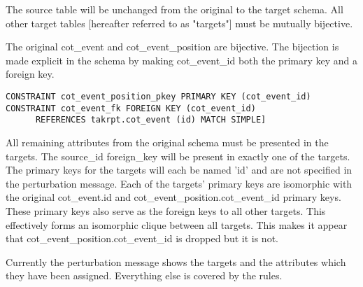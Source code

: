 \documentclass{article}
\begin{document}
The source table will be unchanged from the original to the target schema.
All other target tables [hereafter referred to as "targets"]
must be mutually bijective.

The original cot_event and cot_event_position are bijective.
The bijection is made explicit in the schema by making cot_event_id both
the primary key and a foreign key.
\begin{verbatim}
CONSTRAINT cot_event_position_pkey PRIMARY KEY (cot_event_id)
CONSTRAINT cot_event_fk FOREIGN KEY (cot_event_id)
      REFERENCES takrpt.cot_event (id) MATCH SIMPLE]
\end{verbatim}

All remaining attributes from the original schema must
be presented in the targets.
The source_id foreign_key will be present in exactly one of the targets.
The primary keys for the targets will each be named 'id'
and are not specified in the perturbation message.
Each of the targets' primary keys are isomorphic with the
original cot_event.id and cot_event_position.cot_event_id primary keys.
These primary keys also serve as the foreign keys to all other targets.
This effectively forms an isomorphic clique between all targets.
This makes it appear that cot_event_position.cot_event_id
is dropped but it is not.

Currently the perturbation message shows the targets
and the attributes which they have been assigned.
Everything else is covered by the rules.
\end{document}
